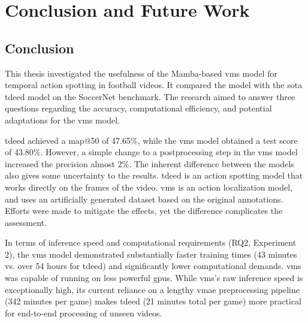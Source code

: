 \chapter{Conclusion and Future Work}
\label{chap:conclusion}

\section{Conclusion}
\label{sec:conclusion}
This thesis investigated the usefulness of the Mamba-based \acrfull{vms} model for temporal action spotting in football videos. It compared the model with the \acrfull{sota} \acrfull{tdeed} model on the SoccerNet benchmark. The research aimed to answer three questions regarding the accuracy, computational efficiency, and potential adaptations for the \acrshort{vms} model.


\acrshort{tdeed} achieved a \acrshort{map}@50 of 47.65\%, while the \acrshort{vms} model obtained a test score of 43.80\%. However, a simple change to a postprocessing step in the \acrshort{vms} model increased the precision almost 2\%. The inherent difference between the models also gives some uncertainty to the results. \acrshort{tdeed} is an action spotting model that works directly on the frames of the video. \acrshort{vms} is an action localization model, and uses an artificially generated dataset based on the original annotations. Efforts were made to mitigate the effects, yet the difference complicates the assessment. 

In terms of inference speed and computational requirements (RQ2, Experiment 2), the \acrshort{vms} model demonstrated substantially faster training times (43 minutes vs. over 54 hours for \acrshort{tdeed}) and significantly lower computational demands. \acrshort{vms} was capable of running on less powerful \acrshort{gpu}s. While \acrshort{vms}'s raw inference speed is exceptionally high, its current reliance on a lengthy \acrshort{vmae} preprocessing pipeline (342 minutes per game) makes \acrshort{tdeed} (21 minutes total per game) more practical for end-to-end processing of unseen videos.

